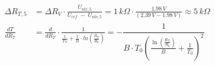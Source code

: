 \begin{align}
\Delta R_{T,5} &= \Delta R_V \cdot \frac{U_{ntc,5}}{U_{ref}\;-\;U_{ntc,5}} = 1\,k\Omega \cdot \frac{1.98\,V}{(2.39\,V-1.98\,V)} \approx 5\,k\Omega \label{eq: dRT} \\
\frac{dT}{dR_T} &= \frac{d}{dR_T} \cdot \frac{1}{\frac{1}{T_N}+\frac{1}{B} \cdot ln(\frac{R_T}{R_0})} = -\dfrac{1}{B\cdot T_0\left(\frac{\ln\left(\frac{R_\text{T}}{R_0}\right)}{B}+\frac{1}{T_0}\right)^2}
\end{align}






